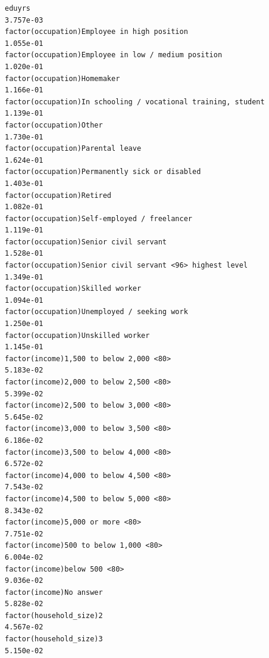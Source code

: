 \documentclass[
]{article}
\begin{document}
\begin{table}
\begin{minipage}[t]{\linewidth}
{\begin{verbatim}
eduyrs                                                                             3.757e-03
factor(occupation)Employee in high position                                        1.055e-01
factor(occupation)Employee in low / medium position                                1.020e-01
factor(occupation)Homemaker                                                        1.166e-01
factor(occupation)In schooling / vocational training, student                      1.139e-01
factor(occupation)Other                                                            1.730e-01
factor(occupation)Parental leave                                                   1.624e-01
factor(occupation)Permanently sick or disabled                                     1.403e-01
factor(occupation)Retired                                                          1.082e-01
factor(occupation)Self-employed / freelancer                                       1.119e-01
factor(occupation)Senior civil servant                                             1.528e-01
factor(occupation)Senior civil servant <96> highest level                          1.349e-01
factor(occupation)Skilled worker                                                   1.094e-01
factor(occupation)Unemployed / seeking work                                        1.250e-01
factor(occupation)Unskilled worker                                                 1.145e-01
factor(income)1,500 to below 2,000 <80>                                            5.183e-02
factor(income)2,000 to below 2,500 <80>                                            5.399e-02
factor(income)2,500 to below 3,000 <80>                                            5.645e-02
factor(income)3,000 to below 3,500 <80>                                            6.186e-02
factor(income)3,500 to below 4,000 <80>                                            6.572e-02
factor(income)4,000 to below 4,500 <80>                                            7.543e-02
factor(income)4,500 to below 5,000 <80>                                            8.343e-02
factor(income)5,000 or more <80>                                                   7.751e-02
factor(income)500 to below 1,000 <80>                                              6.004e-02
factor(income)below 500 <80>                                                       9.036e-02
factor(income)No answer                                                            5.828e-02
factor(household_size)2                                                            4.567e-02
factor(household_size)3                                                            5.150e-02

\end{verbatim}}
\end{minipage}
\end{table}
\end{document}

